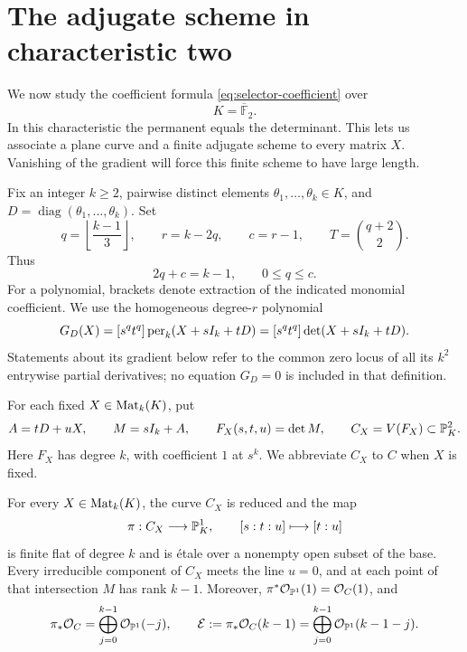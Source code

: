 \section{The adjugate scheme in characteristic two}
\label{sec:adjugate}

We now study the coefficient formula \eqref{eq:selector-coefficient} over
\[
 K=\overline{\mathbb F}_2.
\]
In this characteristic the permanent equals the determinant.  This lets
us associate a plane curve and a finite adjugate scheme to every matrix
\(X\).  Vanishing of the gradient will force this finite scheme to have
large length.

Fix an integer \(k\ge2\), pairwise distinct elements
\(\theta_1,\ldots,\theta_k\in K\), and
\(D=\operatorname{diag}(\theta_1,\ldots,\theta_k)\).  Set
\begin{equation}
 \label{eq:adjugate-parameters}
 q=\left\lfloor\frac{k-1}{3}\right\rfloor,\qquad
 r=k-2q,\qquad c=r-1,\qquad T=\binom{q+2}{2}.
\end{equation}
Thus
\begin{equation}
 \label{eq:adjugate-degrees}
 2q+c=k-1,\qquad 0\le q\le c.
\end{equation}
For a polynomial, brackets denote extraction of the indicated monomial
coefficient.  We use the homogeneous degree-\(r\) polynomial
\begin{equation}
 \label{eq:adjugate-coefficient-polynomial}
 G_D(X)=[s^qt^q]\operatorname{per}_k(X+sI_k+tD)
       =[s^qt^q]\det(X+sI_k+tD).
\end{equation}
Statements about its gradient below refer to the common zero locus of
all its \(k^2\) entrywise partial derivatives; no equation \(G_D=0\) is
included in that definition.

For each fixed \(X\in\operatorname{Mat}_k(K)\), put
\begin{equation}
 \label{eq:adjugate-curve}
 A=tD+uX,\qquad M=sI_k+A,\qquad
 F_X(s,t,u)=\det M,\qquad C_X=V(F_X)\subset\mathbb P^2_K.
\end{equation}
Here \(F_X\) has degree \(k\), with coefficient \(1\) at \(s^k\).
We abbreviate \(C_X\) to \(C\) when \(X\) is fixed.

\begin{lemma}
 \label{lem:adjugate-projection}
For every \(X\in\operatorname{Mat}_k(K)\), the curve \(C_X\) is reduced and the map
\[
 \pi:C_X\longrightarrow\mathbb P^1_K,\qquad [s:t:u]\longmapsto[t:u]
\]
is finite flat of degree \(k\) and is \'{e}tale over a nonempty open
subset of the base.  Every irreducible component of \(C_X\) meets the
line \(u=0\), and at each point of that intersection \(M\) has rank
\(k-1\).  Moreover, \(\pi^*\mathcal O_{\mathbb P^1}(1)=\mathcal O_C(1)\), and
\begin{equation}
 \label{eq:adjugate-splitting}
 \pi_*\mathcal O_C=\bigoplus_{j=0}^{k-1}\mathcal O_{\mathbb P^1}(-j),
 \qquad
 \mathcal E:=\pi_*\mathcal O_C(k-1)
       =\bigoplus_{j=0}^{k-1}\mathcal O_{\mathbb P^1}(k-1-j).
\end{equation}
\end{lemma}

